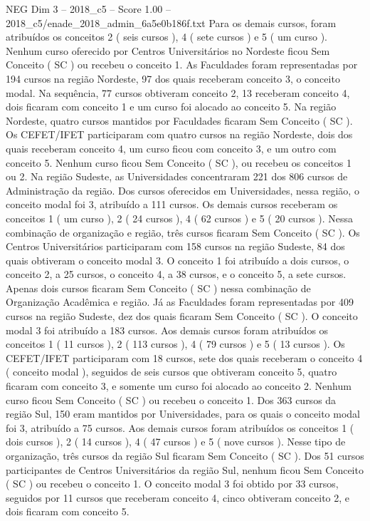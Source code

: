 \begin{textsample}{NEG Dim 3 – 2018\_c5 – Score 1.00 – 2018\_c5/enade\_2018\_admin\_6a5e0b186f.txt}
Para os demais cursos, foram atribuídos os conceitos 2 ( seis cursos ), 4 ( sete cursos ) e 5 ( um curso ).
Nenhum curso oferecido por Centros Universitários no Nordeste ficou Sem Conceito ( SC ) ou recebeu o conceito 1.
As Faculdades foram representadas por 194 cursos na região Nordeste, 97 dos quais receberam conceito 3, o conceito modal.
Na sequência, 77 cursos obtiveram conceito 2, 13 receberam conceito 4, dois ficaram com conceito 1 e um curso foi alocado ao conceito 5.
Na região Nordeste, quatro cursos mantidos por Faculdades ficaram Sem Conceito ( SC ).
Os CEFET/IFET participaram com quatro cursos na região Nordeste, dois dos quais receberam conceito 4, um curso ficou com conceito 3, e um outro com conceito 5.
Nenhum curso ficou Sem Conceito ( SC ), ou recebeu os conceitos 1 ou 2.
Na região Sudeste, as Universidades concentraram 221 dos 806 cursos de Administração da região.
Dos cursos oferecidos em Universidades, nessa região, o conceito modal foi 3, atribuído a 111 cursos.
Os demais cursos receberam os conceitos 1 ( um curso ), 2 ( 24 cursos ), 4 ( 62 cursos ) e 5 ( 20 cursos ).
Nessa combinação de organização e região, três cursos ficaram Sem Conceito ( SC ).
Os Centros Universitários participaram com 158 cursos na região Sudeste, 84 dos quais obtiveram o conceito modal 3.
O conceito 1 foi atribuído a dois cursos, o conceito 2, a 25 cursos, o conceito 4, a 38 cursos, e o conceito 5, a sete cursos.
Apenas dois cursos ficaram Sem Conceito ( SC ) nessa combinação de Organização Acadêmica e região.
Já as Faculdades foram representadas por 409 cursos na região Sudeste, dez dos quais ficaram Sem Conceito ( SC ).
O conceito modal 3 foi atribuído a 183 cursos.
Aos demais cursos foram atribuídos os conceitos 1 ( 11 cursos ), 2 ( 113 cursos ), 4 ( 79 cursos ) e 5 ( 13 cursos ).
Os CEFET/IFET participaram com 18 cursos, sete dos quais receberam o conceito 4 ( conceito modal ), seguidos de seis cursos que obtiveram conceito 5, quatro ficaram com conceito 3, e somente um curso foi alocado ao conceito 2.
Nenhum curso ficou Sem Conceito ( SC ) ou recebeu o conceito 1.
Dos 363 cursos da região Sul, 150 eram mantidos por Universidades, para os quais o conceito modal foi 3, atribuído a 75 cursos.
Aos demais cursos foram atribuídos os conceitos 1 ( dois cursos ), 2 ( 14 cursos ), 4 ( 47 cursos ) e 5 ( nove cursos ).
Nesse tipo de organização, três cursos da região Sul ficaram Sem Conceito ( SC ).
Dos 51 cursos participantes de Centros Universitários da região Sul, nenhum ficou Sem Conceito ( SC ) ou recebeu o conceito 1.
O conceito modal 3 foi obtido por 33 cursos, seguidos por 11 cursos que receberam conceito 4, cinco obtiveram conceito 2, e dois ficaram com conceito 5.

\end{textsample}
